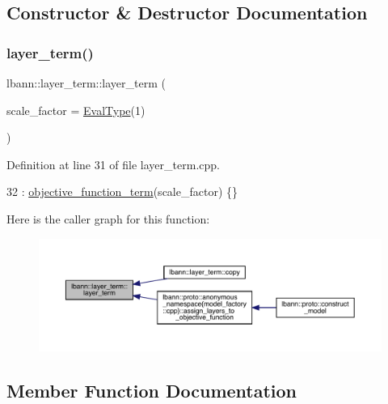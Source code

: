 \subsection{Constructor \& Destructor Documentation}
\mbox{\label{classlbann_1_1layer__term_a5c9eec2b5212adc5dc947ba2e9c88802}} 
\subsubsection{\texorpdfstring{layer\+\_\+term()}{layer\_term()}}
{\footnotesize\ttfamily lbann\+::layer\+\_\+term\+::layer\+\_\+term (\begin{DoxyParamCaption}\item[{\hyperlink{base_8hpp_a3266f5ac18504bbadea983c109566867}{Eval\+Type}}]{scale\+\_\+factor = {\ttfamily \hyperlink{base_8hpp_a3266f5ac18504bbadea983c109566867}{Eval\+Type}(1)} }\end{DoxyParamCaption})}



Definition at line 31 of file layer\+\_\+term.\+cpp.


\begin{DoxyCode}
32   : \hyperlink{classlbann_1_1objective__function__term_a8c019e3c880f38dc20275e395acaeca1}{objective\_function\_term}(scale\_factor) \{\}
\end{DoxyCode}
Here is the caller graph for this function\+:\nopagebreak
\begin{figure}[H]
\begin{center}
\leavevmode
\includegraphics[width=350pt]{classlbann_1_1layer__term_a5c9eec2b5212adc5dc947ba2e9c88802_icgraph}
\end{center}
\end{figure}


\subsection{Member Function Documentation}
\mbox{\label{classlbann_1_1layer__term_ab082c3a6feb225abb8e55595373532bf}} 
